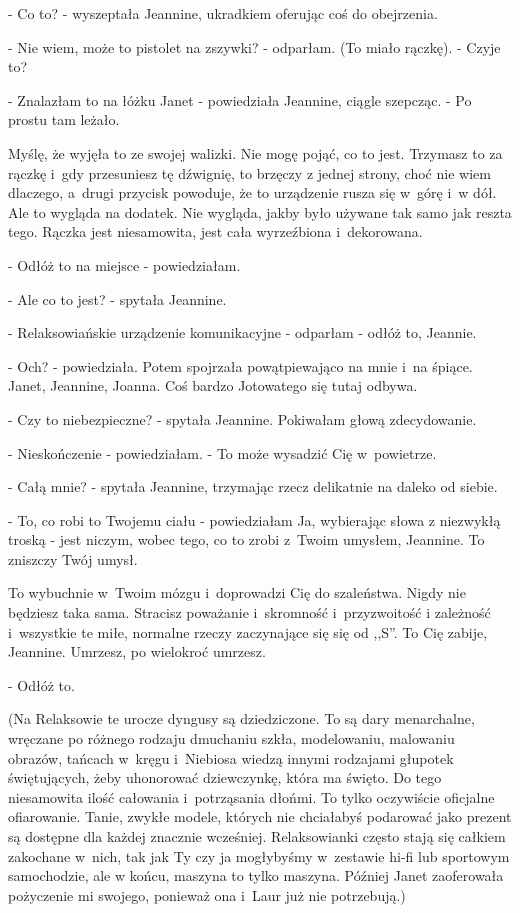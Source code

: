 \documentclass[oneside,polish,12pt,sfheadings]{mwbk}
\begin{document}
- Co to? - wyszeptała Jeannine, ukradkiem oferując coś do obejrzenia.

- Nie wiem, może to pistolet na zszywki? - odparłam. (To miało rączkę).
- Czyje to?

- Znalazłam to na łóżku Janet - powiedziała Jeannine, ciągle szepcząc.
- Po prostu tam leżało.

Myślę, że wyjęła to ze swojej walizki. Nie mogę pojąć, co to jest.
Trzymasz to za rączkę i~gdy przesuniesz tę dźwignię, to brzęczy z
jednej strony, choć nie wiem dlaczego, a~drugi przycisk powoduje,
że to urządzenie rusza się w~górę i~w dół. Ale to wygląda na dodatek.
Nie wygląda, jakby było używane tak samo jak reszta tego. Rączka jest
niesamowita, jest cała wyrzeźbiona i~dekorowana.

- Odłóż to na miejsce - powiedziałam.

- Ale co to jest? - spytała Jeannine.

- Relaksowiańskie urządzenie komunikacyjne - odparłam - odłóż to,
Jeannie.

- Och? - powiedziała. Potem spojrzała powątpiewająco na mnie i~na
śpiące. Janet, Jeannine, Joanna. Coś bardzo Jotowatego się tutaj odbywa.

- Czy to niebezpieczne? - spytała Jeannine. Pokiwałam głową zdecydowanie.

- Nieskończenie - powiedziałam. - To może wysadzić Cię w~powietrze.

- Całą mnie? - spytała Jeannine, trzymając rzecz delikatnie na daleko
od siebie.

- To, co robi to Twojemu ciału - powiedziałam Ja, wybierając słowa
z niezwykłą troską - jest niczym, wobec tego, co to zrobi z~Twoim
umysłem, Jeannine. To zniszczy Twój umysł.

To wybuchnie w~Twoim mózgu i~doprowadzi Cię do szaleństwa. Nigdy nie
będziesz taka sama. Stracisz poważanie i~skromność i~przyzwoitość
i zależność i~wszystkie te miłe, normalne rzeczy zaczynające się się
od ,,S''. To Cię zabije, Jeannine. Umrzesz, po wielokroć umrzesz.

- Odłóż to.

(Na Relaksowie te urocze dyngusy są dziedziczone. To są dary menarchalne,
wręczane po różnego rodzaju dmuchaniu szkła, modelowaniu, malowaniu
obrazów, tańcach w~kręgu i~Niebiosa wiedzą innymi rodzajami głupotek
świętujących, żeby uhonorować dziewczynkę, która ma święto. Do tego
niesamowita ilość całowania i~potrząsania dłońmi. To tylko oczywiście
oficjalne ofiarowanie. Tanie, zwykłe modele, których nie chciałabyś
podarować jako prezent są dostępne dla każdej znacznie wcześniej.
Relaksowianki często stają się całkiem zakochane w~nich, tak jak Ty
czy ja mogłybyśmy w~zestawie hi-fi lub sportowym samochodzie, ale
w końcu, maszyna to tylko maszyna. Później Janet zaoferowała pożyczenie
mi swojego, ponieważ ona i~Laur już nie potrzebują.)
\end{document}
